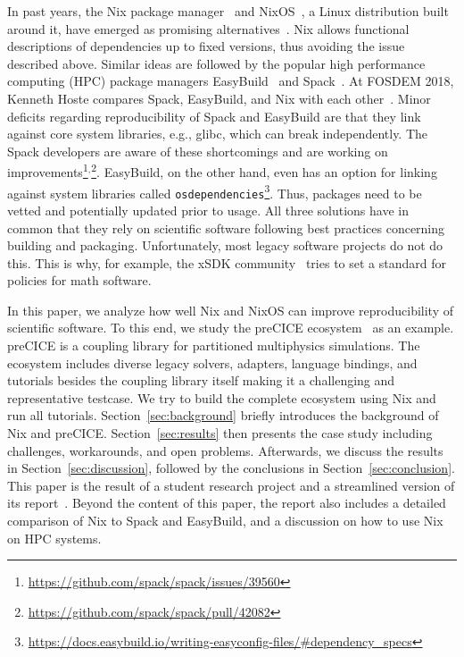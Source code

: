 \documentclass{eceasst}
\begin{document}
In past years, the Nix package manager~\cite{Dolstra_2004} and NixOS~\cite{Dolstra_2010}, a Linux distribution built around it, have emerged as promising alternatives~\cite{Devresse_2015}.
Nix allows functional descriptions of dependencies up to fixed versions, thus avoiding the issue described above.
Similar ideas are followed by the popular high performance computing (HPC) package managers EasyBuild~\cite{easybuil6495863} and Spack~\cite{spack7832814}.
At FOSDEM 2018, Kenneth Hoste compares Spack, EasyBuild, and Nix with each other~\cite{Hoste}.
Minor deficits regarding reproducibility of Spack and EasyBuild are that they link against core system libraries, e.g., glibc, which can break independently. The Spack developers are aware of these shortcomings and are working on improvements\footnote{\url{https://github.com/spack/spack/issues/39560}}$^,$\footnote{\url{https://github.com/spack/spack/pull/42082}}.
EasyBuild, on the other hand, even has an option for linking against system libraries called \texttt{osdependencies}\footnote{\url{https://docs.easybuild.io/writing-easyconfig-files/\#dependency\_specs}}. Thus, packages need to be vetted and potentially updated prior to usage.
All three solutions have in common that they rely on scientific software following best practices concerning building and packaging.
Unfortunately, most legacy software projects do not do this.
This is why, for example, the xSDK community~\cite{xSDK2023} tries to set a standard for policies for math software.

In this paper, we analyze how well Nix and NixOS can improve reproducibility of scientific software.
To this end, we study the preCICE ecosystem~\cite{preCICEv2} as an example.
preCICE is a coupling library for partitioned multiphysics simulations.
The ecosystem includes diverse legacy solvers, adapters, language bindings, and tutorials besides the coupling library itself making it a challenging and representative testcase.
We try to build the complete ecosystem using Nix and run all tutorials.
Section~\ref{sec:background} briefly introduces the background of Nix and preCICE. Section~\ref{sec:results} then presents the case study including challenges, workarounds, and open problems.
Afterwards, we discuss the results in Section~\ref{sec:discussion}, followed by the conclusions in Section~\ref{sec:conclusion}.
This paper is the result of a student research project and a streamlined version of its report~\cite{studentreport}.
Beyond the content of this paper, the report also includes a detailed comparison of Nix to Spack and EasyBuild, and a discussion on how to use Nix on HPC systems.
\end{document}
